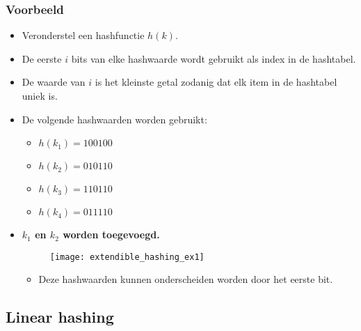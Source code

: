 \subsubsection{Voorbeeld}
\begin{itemize}
    \item Veronderstel een hashfunctie $h(k)$.
    \item De eerste $i$ bits van elke hashwaarde wordt gebruikt als index in de hashtabel. 
    \item De waarde van $i$ is het kleinste getal zodanig dat elk item in de hashtabel uniek is.
    \item De volgende hashwaarden worden gebruikt:
    \begin{itemize}
        \item $h(k_1) = 100100$
        \item $h(k_2) = 010110$
        \item $h(k_3) = 110110$
        \item $h(k_4) = 011110$
    \end{itemize}
    \item \textbf{$k_1$ en $k_2$ worden toegevoegd.}
    \begin{figure}[ht]
        \centering
        \texttt{[image: extendible\_hashing\_ex1]}
        \caption{}
        \label{fig:extendible_hashing_ex1}
    \end{figure}
    \begin{itemize}
        \item Deze hashwaarden kunnen onderscheiden worden door het eerste bit.
    \end{itemize}
\end{itemize}

\subsection{Linear hashing}